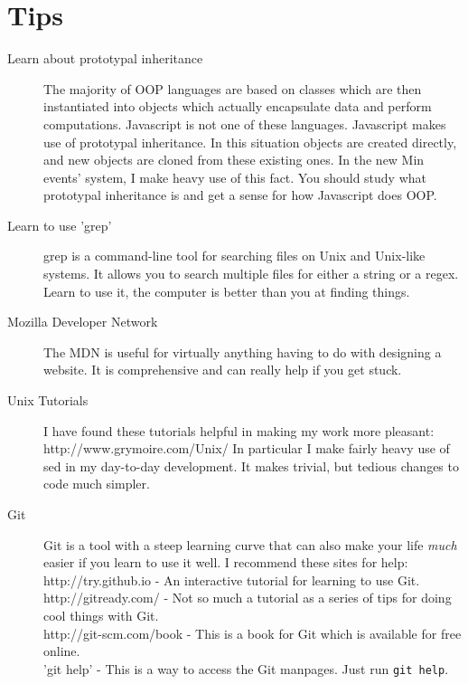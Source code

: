 \documentclass[letterpaper]{article}
\begin{document}
\section*{Tips}
\begin{description}
    \item[Learn about prototypal inheritance] The majority of OOP languages are
        based on classes which are then instantiated into objects which actually
        encapsulate data and perform computations. Javascript is not one of
        these languages. Javascript makes use of prototypal inheritance. In this
        situation objects are created directly, and new objects are cloned from
        these existing ones. In the new Min events' system, I make heavy use of
        this fact. You should study what prototypal inheritance is and get a
        sense for how Javascript does OOP.
    \item[Learn to use 'grep'] grep is a command-line tool for searching files
        on Unix and Unix-like systems. It allows you to search multiple files
        for either a string or a regex. Learn to use it, the computer is better
        than you at finding things.
    \item[Mozilla Developer Network] The MDN is useful for virtually anything
        having to do with designing a website. It is comprehensive and can
        really help if you get stuck.
    \item[Unix Tutorials] I have found these tutorials helpful in making my work
        more pleasant: http://www.grymoire.com/Unix/ 
        In particular I make fairly heavy use of sed in my day-to-day
        development. It makes trivial, but tedious changes to code much
        simpler.
    \item[Git] Git is a tool with a steep learning curve that can also make your
        life \emph{much} easier if you learn to use it well. I recommend these
        sites for help:\\ 
        http://try.github.io - An interactive tutorial for learning to use
        Git.\\
        http://gitready.com/ - Not so much a tutorial as a series of tips for
        doing cool things with Git.\\
        http://git-scm.com/book - This is a book for Git which is available for
        free online. \\
        'git help' - This is a way to access the Git manpages. 
        Just run \verb+git help+.
\end{description}
\end{document}
